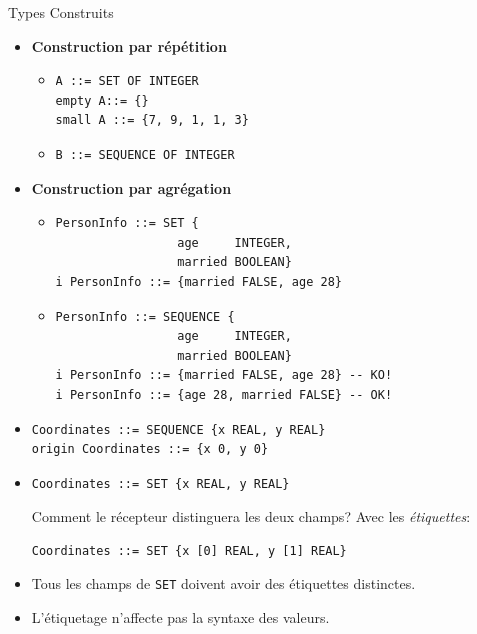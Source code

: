 \begin{slide}
\begin{block} {Types Construits} \end{block}

\begin{itemize}
  \item {\bf Construction par répétition}
        \begin{itemize}
          \item
\begin{verbatim}
A ::= SET OF INTEGER
empty A::= {}
small A ::= {7, 9, 1, 1, 3}
\end{verbatim}

          \item
\begin{verbatim}
B ::= SEQUENCE OF INTEGER
\end{verbatim}
        \end{itemize}

  \item {\bf Construction par agrégation}
        \begin{itemize}
\item
\begin{verbatim}
PersonInfo ::= SET {
                 age     INTEGER,
                 married BOOLEAN}
i PersonInfo ::= {married FALSE, age 28}
\end{verbatim}

  \item
\begin{verbatim}
PersonInfo ::= SEQUENCE {
                 age     INTEGER,
                 married BOOLEAN}
i PersonInfo ::= {married FALSE, age 28} -- KO!
i PersonInfo ::= {age 28, married FALSE} -- OK!
\end{verbatim}
        \end{itemize}

  \item
\begin{verbatim}
Coordinates ::= SEQUENCE {x REAL, y REAL}
origin Coordinates ::= {x 0, y 0}
\end{verbatim}

  \item
\begin{verbatim}
Coordinates ::= SET {x REAL, y REAL}
\end{verbatim} 

Comment le récepteur distinguera les deux champs? Avec les {\em
étiquettes}:

\begin{verbatim}
Coordinates ::= SET {x [0] REAL, y [1] REAL}
\end{verbatim}

  \item Tous les champs de {\tt SET} doivent avoir des étiquettes
        distinctes.

  \item L'étiquetage n'affecte pas la syntaxe des valeurs.
\end{itemize}

\end{slide}

